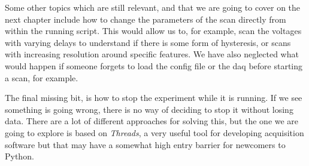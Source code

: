 Some other topics which are still relevant, and that we are going to cover on the next chapter include how to change the parameters of the scan directly from within the running script. This would allow us to, for example, scan the voltages with varying delays to understand if there is some form of hysteresis, or scans with increasing resolution around specific features. We have also neglected what would happen if someone forgets to load the config file or the daq before starting a scan, for example.

The final missing bit, is how to stop the experiment while it is running. If we see something is going wrong, there is no way of deciding to stop it without losing data. There are a lot of different approaches for solving this, but the one we are going to explore is based on \emph{Threads}, a very useful tool for developing acquisition software but that may have a somewhat high entry barrier for newcomers to Python.
